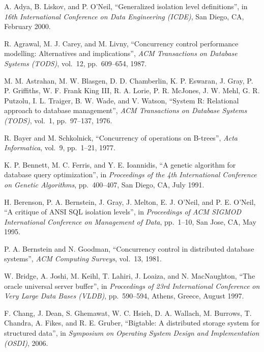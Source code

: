 \documentclass[a4paper,11pt,twoside,openright]{book}
\begin{document}
\begin{enumerate}[label={[\arabic*]}]

\item
  A. Adya, B. Liskov, and P. O'Neil, ``Generalized isolation level
  definitions'', in \emph{16th International Conference on Data Engineering (ICDE)}, San
Diego, CA, February 2000.
\item
  R. Agrawal, M. J. Carey, and M. Livny, ``Concurrency control
  performance modelling: Alternatives and implications'', \emph{ACM
  Transactions on Database Systems (TODS)}, vol.~12, pp.~609--654,
  1987.
\item
  M. M. Astrahan, M. W. Blasgen, D. D. Chamberlin, K. P. Eswaran, J.
  Gray, P. P. Griffiths, W. F. Frank King III, R. A. Lorie, P. R.
  McJones, J. W. Mehl, G. R. Putzolu, I. L. Traiger, B. W. Wade, and V.
  Watson, ``System R: Relational approach to database management'',
  \emph{ACM Transactions on Database Systems} \emph{(TODS)}, vol.~1,
  pp.~97--137, 1976.
\item
  R. Bayer and M. Schkolnick, ``Concurrency of operations on B-trees'',
  \emph{Acta} \emph{Informatica}, vol.~9, pp.~1--21, 1977.
\item
  K. P. Bennett, M. C. Ferris, and Y. E. Ioannidis, ``A genetic
  algorithm for database query optimization'', in \emph{Proceedings of
  the 4th International Conference on Genetic Algorithms},
  pp.~400--407, San Diego, CA, July 1991.
\item
  H. Berenson, P. A. Bernstein, J. Gray, J. Melton, E. J. O'Neil, and P.
  E. O'Neil, ``A critique of ANSI SQL isolation levels'', in
  \emph{Proceedings of ACM SIGMOD} \emph{International Conference on
  Management of Data}, pp.~1--10, San Jose, CA, May 1995.
\item
  P. A. Bernstein and N. Goodman, ``Concurrency control in distributed
  database systems'', \emph{ACM Computing Surveys}, vol.~13, 1981.
\item
  W. Bridge, A. Joshi, M. Keihl, T. Lahiri, J. Loaiza, and N.
  MacNaughton, ``The oracle universal server buffer'', in
  \emph{Proceedings of 23rd International Conference} \emph{on Very
  Large Data Bases (VLDB)}, pp.~590--594, Athens, Greece, August 1997.
\item
  F. Chang, J. Dean, S. Ghemawat, W. C. Hsieh, D. A. Wallach, M.
  Burrows, T. Chandra, A. Fikes, and R. E. Gruber, ``Bigtable: A
  distributed storage system for structured data'', in \emph{Symposium
  on Operating System Design and} \emph{Implementation (OSDI)}, 2006.
\item

\end{enumerate}
\end{document}
